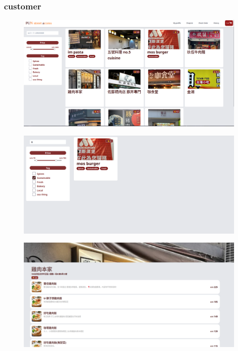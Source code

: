 \documentclass[a4paper, 12pt]{article}
\begin{document}
\subsubsection{customer}
\begin{figure}[hp]
    \centerline{\includegraphics[width=40em]{gui-snapshot/customer/shoplist.png}}
    \label{fig:enter-label}
\end{figure}
\newline
{}
\begin{figure}[hp]
    \centerline{\includegraphics[width=40em]{gui-snapshot/customer/search.png}}
    \label{fig:enter-label}
\end{figure}
\newpage
{}
\begin{figure}[hp]
    \centerline{\includegraphics[width=40em]{gui-snapshot/customer/shop.png}}
    \label{fig:enter-label}
\end{figure}
\end{document}
